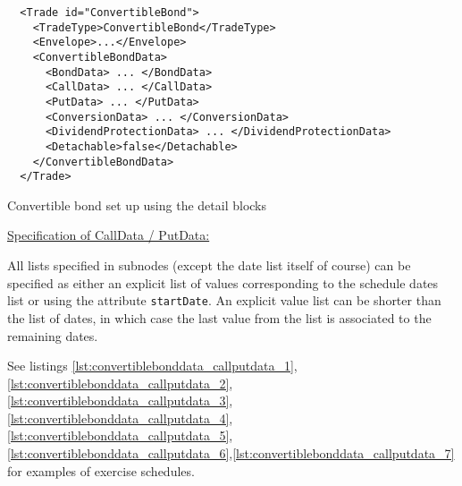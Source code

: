\begin{listing}[H]
\begin{verbatim}
  <Trade id="ConvertibleBond">
    <TradeType>ConvertibleBond</TradeType>
    <Envelope>...</Envelope>
    <ConvertibleBondData>
      <BondData> ... </BondData>
      <CallData> ... </CallData>
      <PutData> ... </PutData>
      <ConversionData> ... </ConversionData>
      <DividendProtectionData> ... </DividendProtectionData>
      <Detachable>false</Detachable>
    </ConvertibleBondData>
  </Trade>
\end{verbatim}
\caption{Convertible bond set up using the detail blocks}
\label{lst:convertiblebonddata2}
\end{listing}

\underline{Specification of CallData / PutData:}

All lists specified in subnodes (except the date list itself of course) can be specified as either an explicit list of
values corresponding to the schedule dates list or using the attribute \verb+startDate+. An explicit value list can be
shorter than the list of dates, in which case the last value from the list is associated to the remaining dates.

See listings
\ref{lst:convertiblebonddata_callputdata_1},\ref{lst:convertiblebonddata_callputdata_2},\ref{lst:convertiblebonddata_callputdata_3},\ref{lst:convertiblebonddata_callputdata_4},\ref{lst:convertiblebonddata_callputdata_5},\ref{lst:convertiblebonddata_callputdata_6},\ref{lst:convertiblebonddata_callputdata_7}
for examples of exercise schedules.

